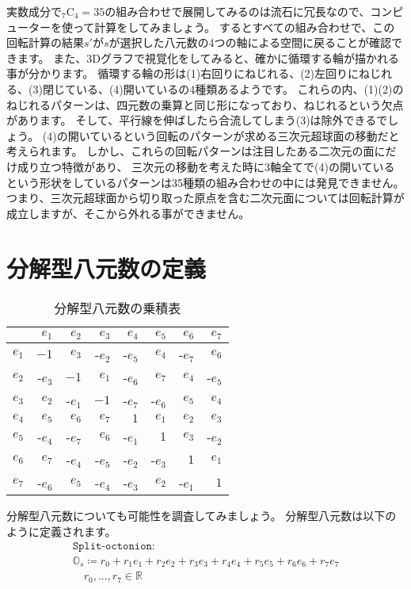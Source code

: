\documentclass[a4paper,12pt,notitlepage]{jsreport}
\begin{document}
実数成分で${}_7 \mathrm{C}_4=35$の組み合わせで展開してみるのは流石に冗長なので、コンピューターを使って計算をしてみましょう。
するとすべての組み合わせで、この回転計算の結果$s'$が$s$が選択した八元数の4つの軸による空間に戻ることが確認できます。
また、3Dグラフで視覚化をしてみると、確かに循環する輪が描かれる事が分かります。
循環する輪の形は(1)右回りにねじれる、(2)左回りにねじれる、(3)閉じている、(4)開いているの4種類あるようです。
これらの内、(1)(2)のねじれるパターンは、四元数の乗算と同じ形になっており、ねじれるという欠点があります。
そして、平行線を伸ばしたら合流してしまう(3)は除外できるでしょう。
(4)の開いているという回転のパターンが求める三次元超球面の移動だと考えられます。
しかし、これらの回転パターンは注目したある二次元の面にだけ成り立つ特徴があり、
三次元の移動を考えた時に3軸全てで(4)の開いているという形状をしているパターンは35種類の組み合わせの中には発見できません。
つまり、三次元超球面から切り取った原点を含む二次元面については回転計算が成立しますが、そこから外れる事ができません。

\section{分解型八元数の定義}

\begin{wraptable}{r}{8cm}
  \caption{分解型八元数の乗積表\label{split-octonion-multiplication-table}}
  \centering
  \begin{tabular}{rrrrrrrr}\hline
        & $e_1$& $e_2$& $e_3$& $e_4$& $e_5$& $e_6$& $e_7$\\\hline
    $e_1$& $ -1$& $e_3$&-$e_2$&-$e_5$& $e_4$&-$e_7$& $e_6$\\\hline
    $e_2$&-$e_3$& $ -1$& $e_1$&-$e_6$& $e_7$& $e_4$&-$e_5$\\\hline
    $e_3$& $e_2$&-$e_1$& $ -1$&-$e_7$&-$e_6$& $e_5$& $e_4$\\\hline
    $e_4$& $e_5$& $e_6$& $e_7$& $  1$& $e_1$& $e_2$& $e_3$\\\hline
    $e_5$&-$e_4$&-$e_7$& $e_6$&-$e_1$& $  1$& $e_3$&-$e_2$\\\hline
    $e_6$& $e_7$&-$e_4$&-$e_5$&-$e_2$&-$e_3$& $  1$& $e_1$\\\hline
    $e_7$&-$e_6$& $e_5$&-$e_4$&-$e_3$& $e_2$&-$e_1$& $  1$\\\hline
  \end{tabular}
\end{wraptable}

分解型八元数についても可能性を調査してみましょう。
分解型八元数は以下のように定義されます。
\begin{multline}
  \texttt{Split-octonion}:\\
  \mathbb{O}_s\coloneq r_0+r_1e_1+r_2e_2+r_3e_3+r_4e_4+r_5e_5+r_6e_6+r_7e_7\\
  \quad r_0,...,r_7\in\mathbb{R}
\end{multline}
\end{document}
